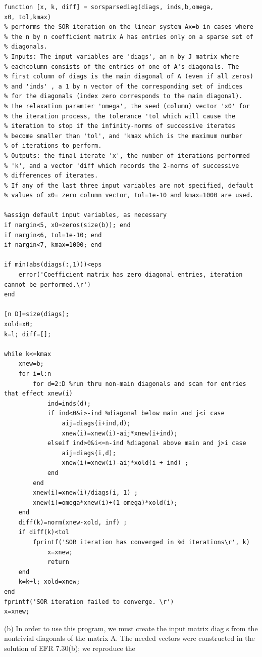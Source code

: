 \documentclass[../main.tex]{subfiles}
\begin{document}
\begin{lstlisting}[numbers=none]
function [x, k, diff] = sorsparsediag(diags, inds,b,omega, 
x0, tol,kmax) 
% performs the SOR iteration on the linear system Ax=b in cases where 
% the n by n coefficient matrix A has entries only on a sparse set of 
% diagonals. 
% Inputs: The input variables are 'diags', an n by J matrix where 
% eachcolumn consists of the entries of one of A's diagonals. The 
% first column of diags is the main diagonal of A (even if all zeros) 
% and 'inds' , a 1 by n vector of the corresponding set of indices 
% for the diagonals (index zero corresponds to the main diagonal). 
% the relaxation paramter 'omega', the seed (column) vector 'x0' for 
% the iteration process, the tolerance 'tol which will cause the 
% iteration to stop if the infinity-norms of successive iterates 
% become smaller than 'tol', and 'kmax which is the maximum number
% of iterations to perform. 
% Outputs: the final iterate 'x', the number of iterations performed 
% 'k', and a vector 'diff which records the 2-norms of successive 
% differences of iterates. 
% If any of the last three input variables are not specified, default 
% values of x0= zero column vector, tol=1e-10 and kmax=1000 are used. 

%assign default input variables, as necessary 
if nargin<5, xO=zeros(size(b)); end 
if nargin<6, tol=1e-10; end 
if nargin<7, kmax=1000; end 

if min(abs(diags(:,1)))<eps 
	error('Coefficient matrix has zero diagonal entries, iteration 
cannot be performed.\r') 
end 

[n D]=size(diags); 
xold=x0; 
k=l; diff=[]; 

while k<=kmax 
	xnew=b; 
	for i=l:n 
		for d=2:D %run thru non-main diagonals and scan for entries that effect xnew(i) 
			ind=inds(d); 
			if ind<0&i>-ind %diagonal below main and j<i case 
				aij=diags(i+ind,d); 
				xnew(i)=xnew(i)-aij*xnew(i+ind); 
			elseif ind>0&i<=n-ind %diagonal above main and j>i case 
				aij=diags(i,d); 
				xnew(i)=xnew(i)-aij*xold(i + ind) ; 
			end 
		end 
		xnew(i)=xnew(i)/diags(i, 1) ; 
		xnew(i)=omega*xnew(i)+(1-omega)*xold(i); 
	end 
	diff(k)=norm(xnew-xold, inf) ; 
	if diff(k)<tol 
		fprintf('SOR iteration has converged in %d iterations\r', k) 
			x=xnew; 
			return 
	end 
	k=k+l; xold=xnew; 
end 
fprintf('SOR iteration failed to converge. \r') 
x=xnew; 
\end{lstlisting}
(b) In order to use this program, we must create the input matrix diag s from the nontrivial diagonals 
of the matrix A. The needed vectors were constructed in the solution of EFR 7.30(b); we reproduce the 
\end{document}
